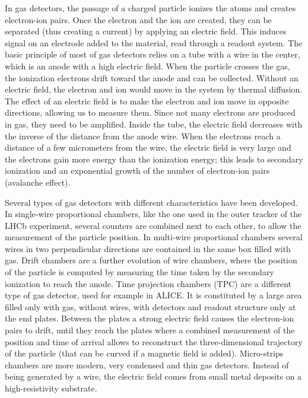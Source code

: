 In gas detectors, the passage of a charged particle ionizes the atoms and creates electron-ion pairs. Once the electron and the ion are created, they can be separated (thus creating a current) by applying an electric field. This induces signal on an electrode added to the material, read through a readout system. The basic principle of most of gas detectors relies on a tube with a wire in the center, which is an anode with a high electric field. When the particle crosses the gas, the ionization electrons drift toward the anode and can be collected. 
Without an electric field, the electron and ion would move in the system by thermal diffusion. The effect of an electric field is to make the electron and ion move in opposite directions, allowing us to measure them. Since not many electrons are produced in gas, they need to be amplified. Inside the tube, the electric field decreases with the inverse of the distance from the anode wire. When the electrons reach a distance of a few micrometers from the wire, the electric field is very large and the electrons gain more energy than the ionization energy; this leads to secondary ionization and an exponential growth of the number of electron-ion pairs (avalanche effect). 

Several types of gas detectors with different characteristics have been developed. In single-wire proportional chambers, like the one used in the outer tracker of the LHCb experiment, several counters are combined next to each other, to allow the measurement of the particle position. In multi-wire proportional chambers \cite{CHARPAK1968262} several wires in two perpendicular directions are contained in the same box filled with gas. 
Drift chambers are a further evolution of wire chambers, where the position of the particle is computed by measuring the time taken by the 
secondary ionization to reach the anode. Time projection chambers (TPC) are a different type of gas detector, used for example in ALICE. 
It is constituted by a large area filled only with gas, without wires, with detectors and readout structure only at the end plates. 
Between the plates a strong electric field causes the electron-ion pairs to drift, 
until they reach the plates where a combined measurement of the position and time of arrival allows to reconstruct the three-dimensional 
trajectory of the particle (that can be curved if a magnetic field is added). 
Micro-strips chambers \cite{OED1988351} are more modern, very condensed and thin gas detectors. 
Instead of being generated by a wire, the electric field comes from small metal deposits on a high-resistivity substrate.   


